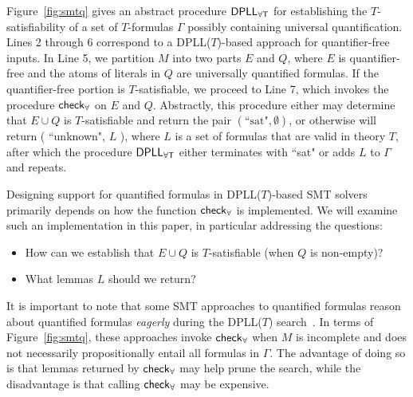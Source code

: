 \documentclass[oribibl]{llncs}
\begin{document}
Figure~\ref{fig:smtq} gives an abstract procedure $\small\mathsf{DPLL_{\forall T}}$
for establishing the $T$-satisfiability of a set of $T$-formulas $\Gamma$ possibly containing universal quantification.
Lines 2 through 6 correspond to a DPLL($T$)-based approach for quantifier-free inputs.
In Line 5, we partition $M$ into two parts $E$ and $Q$,
where $E$ is quantifier-free and the atoms of literals in $Q$ are universally quantified formulas.
If the quantifier-free portion is $T$-satisfiable,
we proceed to Line 7, which invokes the procedure $\small\mathsf{check}_\forall$ on $E$ and $Q$.
Abstractly, this procedure either may determine that $E \cup Q$ is $T$-satisfiable and return the pair $( \text{``sat"}, \emptyset )$,
or otherwise will return ( ``unknown", $L$ ), where $L$ is a set of formulas that are valid in theory $T$,
after which the procedure $\small\mathsf{DPLL_{\forall T}}$ either terminates with ``sat" or adds $L$ to $\Gamma$ and repeats.

Designing support for quantified formulas in DPLL($T$)-based SMT solvers 
primarily depends on how the function $\small\mathsf{check}_\forall$ is implemented.
We will examine such an implementation in this paper, in particular addressing the questions:
\begin{itemize}
\item How can we establish that $E \cup Q$ is $T$-satisfiable (when $Q$ is non-empty)?
\item What lemmas $L$ should we return?
\end{itemize}

It is important to note that some SMT approaches to quantified formulas
reason about quantified formulas \emph{eagerly} during the DPLL($T$) search~\cite{MouraBjoerner07}.
In terms of Figure~\ref{fig:smtq}, these approaches invoke $\small\mathsf{check}_\forall$
when $M$ is incomplete and does not necessarily propositionally entail all formulas in $\Gamma$.
The advantage of doing so is that lemmas returned by $\small\mathsf{check}_\forall$ may help prune the search,
while the disadvantage is that calling $\small\mathsf{check}_\forall$ may be expensive.
\end{document}
